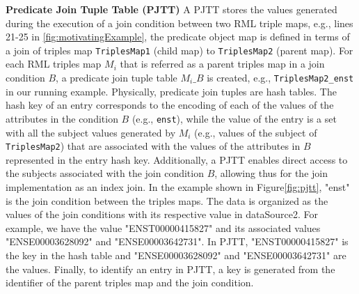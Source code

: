 \noindent
\noindent\textbf{Predicate Join Tuple Table (PJTT)}
A PJTT stores the values generated during the execution of a join condition between two RML triple maps, e.g., lines 21-25 in \autoref{fig:motivatingExample}, the predicate object map is defined in terms of a join of triples map \texttt{TriplesMap1} (child map) to \texttt{TriplesMap2} (parent map). For each RML triples map $M_i$ that is referred as a parent triples map in a join condition $B$, a predicate join tuple table $M_i \_B$ is created, e.g., \texttt{TriplesMap2\_enst} in our running example. 
Physically, predicate join tuples are hash tables. The hash key of an entry corresponds to the encoding of each of the values of the attributes in the condition $B$ (e.g., \texttt{enst}), while the value of the entry is a set with all the subject values generated by $M_i$ (e.g., values of the subject of \texttt{TriplesMap2}) that are associated with the values of the attributes in $B$ represented in the entry hash key.  
 Additionally, a PJTT enables direct access to the subjects associated with the join condition $B$, allowing thus for the join implementation as an index join.  
 In the example shown in Figure\autoref{fig:pjtt}, "enst" is the join condition between the triples maps. The data is organized as the values of the join conditions with its respective value in dataSource2. For example, we have the value "ENST00000415827" and its associated values "ENSE00003628092" and "ENSE00003642731".  In PJTT, "ENST00000415827" is the key in the hash table and "ENSE00003628092" and "ENSE00003642731" are the values. Finally, to identify an entry in PJTT, a key is generated from the identifier of the parent triples map and the join condition.  
